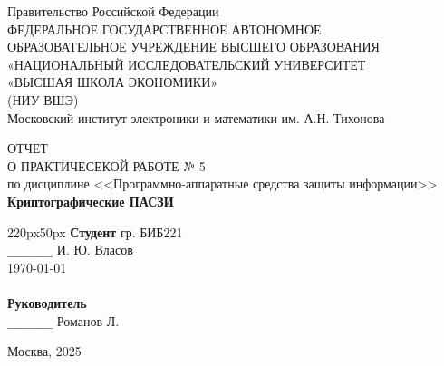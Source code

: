 \begin{center}
    Правительство Российской Федерации \\
ФЕДЕРАЛЬНОЕ ГОСУДАРСТВЕННОЕ АВТОНОМНОЕ \\
ОБРАЗОВАТЕЛЬНОЕ УЧРЕЖДЕНИЕ ВЫСШЕГО ОБРАЗОВАНИЯ \\
«НАЦИОНАЛЬНЫЙ ИССЛЕДОВАТЕЛЬСКИЙ УНИВЕРСИТЕТ \\
«ВЫСШАЯ ШКОЛА ЭКОНОМИКИ» \\
(НИУ ВШЭ) \vspace{24px}\\
Московский институт электроники и математики им. А.Н. Тихонова\\
\vspace*{\fill}
\end{center}
\begingroup
\centering
ОТЧЕТ\\
О ПРАКТИЧЕСЕКОЙ РАБОТЕ № 5 \\
по дисциплине <<Программно-аппаратные средства защиты информации>>\\
\textbf{Криптографические ПАСЗИ}\\
\endgroup
\vspace{48px}
\begin{adjustwidth}{220px}{50px}
    \textbf{Студент} гр. БИБ221 \\
    \texttt{\_\_\_\_\_\_\_} И. Ю. Власов\\
    \today\\
    \vspace{32px}\\
    \textbf{Руководитель}\\
    \texttt{\_\_\_\_\_\_\_} Романов Л.  
\end{adjustwidth}
\vspace*{\fill}
\begin{center}
    Москва, 2025
\end{center}
\clearpage